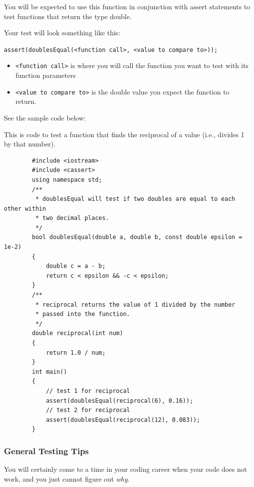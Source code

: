 You will be expected to use this function in conjunction with assert statements to test functions that return the type double.

Your test will look something like this:

\texttt{assert(doublesEqual(<function call>, <value to compare to>));}

\begin{itemize}
    \item \texttt{<function call>} is where you will call the function you want to test with its function parameters
    \item \texttt{<value to compare to>} is the double value you expect the function to return.
\end{itemize}

See the sample code below:

\begin{example}
    This is code to test a function that finds the reciprocal of a value (i.e., divides 1 by that number).
    \begin{verbatim}
        #include <iostream>
        #include <cassert>
        using namespace std;
        /**
         * doublesEqual will test if two doubles are equal to each other within 
         * two decimal places.
         */
        bool doublesEqual(double a, double b, const double epsilon = 1e-2)
        {
            double c = a - b;
            return c < epsilon && -c < epsilon;
        }
        /**
         * reciprocal returns the value of 1 divided by the number 
         * passed into the function.
         */
        double reciprocal(int num)
        {
            return 1.0 / num;
        }
        int main()
        {
            // test 1 for reciprocal
            assert(doublesEqual(reciprocal(6), 0.16));
            // test 2 for reciprocal
            assert(doublesEqual(reciprocal(12), 0.083));
        }
    \end{verbatim}
\end{example}

\subsubsection{General Testing Tips}
You will certainly come to a time in your coding career when your code does not work, and you just cannot figure out \textit{why}.


